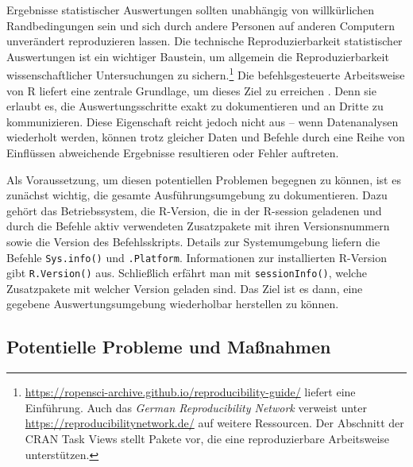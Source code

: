 Ergebnisse statistischer Auswertungen sollten unabhängig von willkürlichen Randbedingungen sein und sich durch andere Personen auf anderen Computern unverändert reproduzieren lassen. Die technische Reproduzierbarkeit statistischer Auswertungen ist ein wichtiger Baustein, um allgemein die Reproduzierbarkeit wissenschaftlicher Untersuchungen zu sichern.\footnote{\url{https://ropensci-archive.github.io/reproducibility-guide/} liefert eine Einführung. Auch das \emph{German Reproducibility Network} verweist unter \url{https://reproducibilitynetwork.de/} auf weitere Ressourcen. Der Abschnitt  der CRAN Task Views \cite{CRANtvReprRer} stellt Pakete vor, die eine reproduzierbare Arbeitsweise unterstützen.} Die befehlsgesteuerte Arbeitsweise von R liefert eine zentrale Grundlage, um dieses Ziel zu erreichen \cite{Gandrud2014}. Denn sie erlaubt es, die Auswertungsschritte exakt zu dokumentieren und an Dritte zu kommunizieren. Diese Eigenschaft reicht jedoch nicht aus -- wenn Datenanalysen wiederholt werden, können trotz gleicher Daten und Befehle durch eine Reihe von Einflüssen abweichende Ergebnisse resultieren oder Fehler auftreten.

Als Voraussetzung, um diesen potentiellen Problemen begegnen zu können, ist es zunächst wichtig, die gesamte Ausführungsumgebung zu dokumentieren. Dazu gehört das Betriebssystem, die R-Version, die in der R-session geladenen und durch die Befehle aktiv verwendeten Zusatzpakete mit ihren Versionsnummern sowie die Version des Befehlsskripts. Details zur Systemumgebung liefern die Befehle \lstinline!Sys.info()! und  \lstinline!.Platform!. Informationen zur installierten R-Version gibt  \lstinline!R.Version()! aus. Schließlich erfährt man mit  \lstinline!sessionInfo()!, welche Zusatzpakete mit welcher Version geladen sind. Das Ziel ist es dann, eine gegebene Auswertungsumgebung wiederholbar herstellen zu können.

\subsection{Potentielle Probleme und Maßnahmen}

